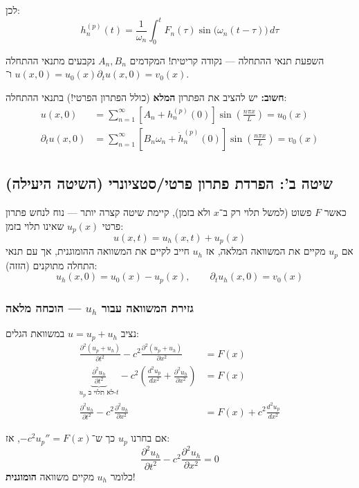 לכן:
\[
\boxed{h_n^{(p)}(t) = \frac{1}{\omega_n}\int_0^t F_n(\tau)\sin\bigl(\omega_n(t-\tau)\bigr)\,d\tau}
\]

\begin{notebox}{השפעת תנאי ההתחלה — נקודה קריטית!}
המקדמים $A_n, B_n$ נקבעים מתנאי ההתחלה $u(x,0)=u_0(x)$ ו־$\partial_t u(x,0)=v_0(x)$. 

\textbf{חשוב:} יש להציב את הפתרון \textbf{המלא} (כולל הפתרון הפרטי!) בתנאי ההתחלה:
\begin{align*}
u(x,0) &= \sum_{n=1}^\infty \left[A_n + h_n^{(p)}(0)\right]\sin\!\left(\frac{n\pi x}{L}\right) = u_0(x) \\
\partial_t u(x,0) &= \sum_{n=1}^\infty \left[B_n\omega_n + \dot{h}_n^{(p)}(0)\right]\sin\!\left(\frac{n\pi x}{L}\right) = v_0(x)
\end{align*}
\end{notebox}

\subsection{שיטה ב': הפרדת פתרון פרטי/סטציונרי (השיטה היעילה)}

כאשר $F$ פשוט (למשל תלוי רק ב־$x$ ולא בזמן), קיימת שיטה קצרה יותר — נוח לנחש פתרון פרטי $u_p(x)$ שאינו תלוי בזמן:
\[
u(x,t)=u_h(x,t)+u_p(x)
\]
אם $u_p$ מקיים את המשוואה המלאה, אז $u_h$ חייב לקיים את המשוואה ההומוגנית, אך עם תנאי התחלה מתוקנים (הזזה):
\[
u_h(x,0)=u_0(x)-u_p(x), \qquad
\partial_t u_h(x,0)=v_0(x)
\]

\subsubsection{גזירת המשוואה עבור $u_h$ — הוכחה מלאה}
נציב $u = u_p + u_h$ במשוואת הגלים:
\begin{align*}
\frac{\partial^2 (u_p + u_h)}{\partial t^2} - c^2\frac{\partial^2 (u_p + u_h)}{\partial x^2} &= F(x) \\
\underbrace{\frac{\partial^2 u_h}{\partial t^2}}_{u_p \text{ לא תלוי ב-}t} - c^2\left(\frac{d^2 u_p}{dx^2} + \frac{\partial^2 u_h}{\partial x^2}\right) &= F(x) \\
\frac{\partial^2 u_h}{\partial t^2} - c^2\frac{\partial^2 u_h}{\partial x^2} &= F(x) + c^2 \frac{d^2 u_p}{dx^2}
\end{align*}

אם בחרנו $u_p$ כך ש־$-c^2 u_p'' = F(x)$, אז:
\[
\frac{\partial^2 u_h}{\partial t^2} - c^2\frac{\partial^2 u_h}{\partial x^2} = 0
\]
כלומר $u_h$ מקיים משוואה \textbf{הומוגנית}!

